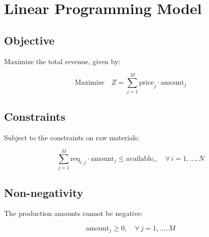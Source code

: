 \documentclass{article}
\begin{document}
\section*{Linear Programming Model}

\subsection*{Objective}
Maximize the total revenue, given by:

\[
\text{Maximize} \quad Z = \sum_{j=1}^{M} \text{price}_j \cdot \text{amount}_j
\]

\subsection*{Constraints}
Subject to the constraints on raw materials:

\[
\sum_{j=1}^{M} \text{req}_{i,j} \cdot \text{amount}_j \leq \text{available}_i, \quad \forall \, i = 1, \ldots, N
\]

\subsection*{Non-negativity}
The production amounts cannot be negative:

\[
\text{amount}_j \geq 0, \quad \forall \, j = 1, \ldots, M
\]
\end{document}
